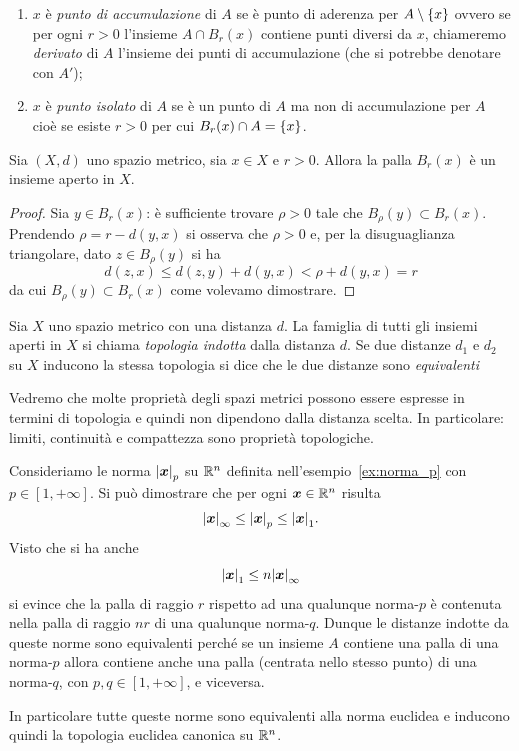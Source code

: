 \begin{definition}
\begin{enumerate}
%
\item
$x$ è \emph{punto di accumulazione}%
%
 di $A$ se
è punto di aderenza per $A \setminus {\left\{ x \right\}}$ ovvero se
per ogni $r>0$ l'insieme $A \cap B_r(x)$ contiene punti diversi da $x$, chiameremo \emph{derivato}%
 di $A$ l'insieme dei punti di accumulazione (che si potrebbe denotare con $A'$);
\item
$x$ è \emph{punto isolato}%
 di $A$ se è un punto di $A$ ma non di accumulazione per $A$ cioè se esiste $r>0$ per cui
$B_r(x) \cap A = {\left\{ x \right\}}$.
\end{enumerate}
\end{definition}

\begin{theorem}
Sia $(X,d)$ uno spazio metrico, sia $x\in X$ e $r>0$. Allora la palla $B_r(x)$ è un insieme aperto in $X$.
\end{theorem}
%
\begin{proof}
Sia $y\in B_r(x)$: è sufficiente trovare $\rho>0$ tale che $B_\rho(y) \subset B_r(x)$. Prendendo $\rho = r-d(y,x)$ si osserva che $\rho >0 $ e, per la disuguaglianza triangolare,
dato $z \in B_\rho(y)$ si ha
\[
  d(z,x) \le d(z,y) + d(y,x) < \rho + d(y,x) = r
\]
da cui $B_\rho(y)\subset B_r(x)$ come volevamo dimostrare.
\end{proof}

\begin{definition}
Sia $X$ uno spazio metrico con una distanza $d$.
La famiglia di tutti gli insiemi aperti in $X$ si chiama 
\emph{topologia indotta} dalla distanza $d$.
Se due distanze $d_1$ e $d_2$ su $X$ inducono la stessa topologia 
si dice che le due distanze sono \emph{equivalenti}%
\end{definition}

Vedremo che molte proprietà degli spazi metrici possono essere espresse
in termini di topologia e quindi non dipendono dalla distanza scelta.
In particolare: limiti, continuità e compattezza sono proprietà topologiche.

\begin{example}
Consideriamo le norma ${\left|\boldsymbol x\right|}_p$ su ${\mathbb R}^n$ definita nell'esempio~\ref{ex:norma_p}
con $p\in [1,+\infty]$.
Si può dimostrare che per ogni $\boldsymbol x \in {\mathbb R}^n$ risulta 
\[
  {\left|\boldsymbol x\right|}_\infty \le {\left|\boldsymbol x\right|}_p \le {\left|\boldsymbol x\right|}_1.
\]
Visto che si ha anche 
\[
  {\left|\boldsymbol x\right|}_1 \le n {\left|\boldsymbol x\right|}_\infty
\]
si evince che la palla di raggio $r$ rispetto ad una qualunque 
norma-$p$ è contenuta nella palla di raggio $nr$ di una qualunque 
norma-$q$. 
Dunque le distanze indotte da queste norme sono equivalenti 
perché se un insieme $A$ contiene una palla di una norma-$p$ allora 
contiene anche una palla (centrata nello stesso punto) di una norma-$q$,
con $p,q\in [1,+\infty]$, e viceversa.

In particolare tutte queste norme sono equivalenti alla norma euclidea 
e inducono quindi la topologia euclidea canonica su ${\mathbb R}^n$.
\end{example}